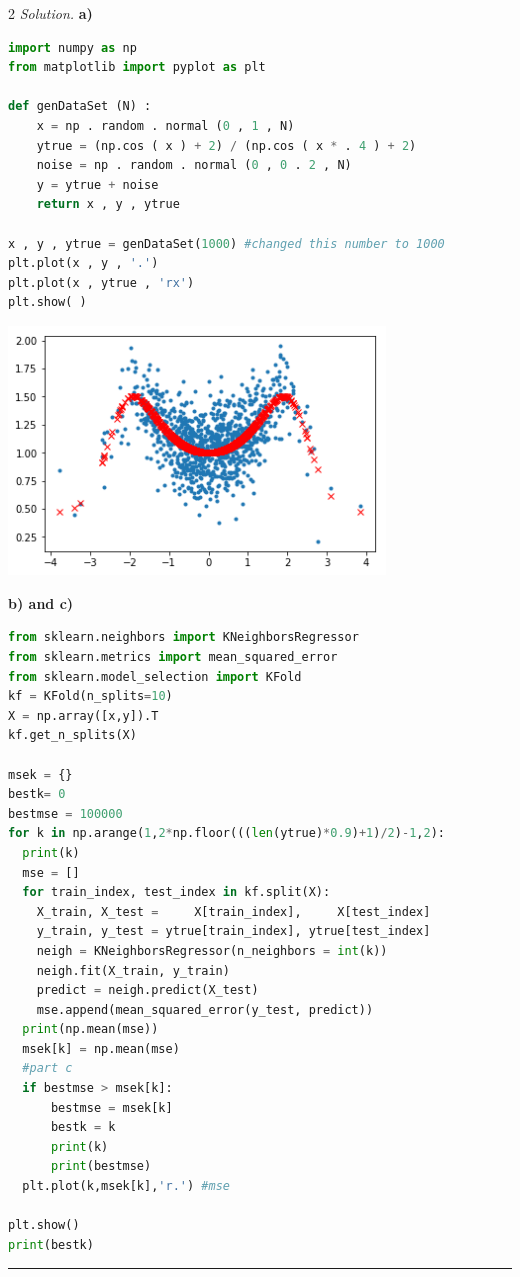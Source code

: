 \documentclass[12pt]{article}
\newcommand{\spacingfactor}{2}
\newcommand\myqed{}                 %
\newcommand{\printmyqed}[1][]       %
  {%
  \ifthenelse{\equal{#1}{Proof}}
  {\renewcommand{\myqed}{\qed}}
  {\renewcommand{\myqed}{}}
  }
\newenvironment{response}[1][\textit{Solution}]{%
  \printmyqed[#1]
  \begin{spacing}{\spacingfactor}
  \medskip                          %
  \noindent \textit{#1.}}{\myqed\end{spacing}\medskip\hrule}
\begin{document}
  
\begin{response}[Solution]
  \textbf{a)} 
  \lstset{language=Python,frame=single}
  \begin{lstlisting}[language=Python,frame=single]
import numpy as np
from matplotlib import pyplot as plt

def genDataSet (N) :
    x = np . random . normal (0 , 1 , N)
    ytrue = (np.cos ( x ) + 2) / (np.cos ( x * . 4 ) + 2)
    noise = np . random . normal (0 , 0 . 2 , N)
    y = ytrue + noise
    return x , y , ytrue

x , y , ytrue = genDataSet(1000) #changed this number to 1000
plt.plot(x , y , '.')
plt.plot(x , ytrue , 'rx')
plt.show( )
  \end{lstlisting}
  \includegraphics[width=100mm]{1a.png}

  \textbf{b) and c)} 
  \lstset{language=Python,frame=single}
  \begin{lstlisting}[language=Python,frame=single]
from sklearn.neighbors import KNeighborsRegressor
from sklearn.metrics import mean_squared_error
from sklearn.model_selection import KFold
kf = KFold(n_splits=10)
X = np.array([x,y]).T
kf.get_n_splits(X)
  
msek = {}
bestk= 0
bestmse = 100000
for k in np.arange(1,2*np.floor(((len(ytrue)*0.9)+1)/2)-1,2):
  print(k)
  mse = []
  for train_index, test_index in kf.split(X):
    X_train, X_test =     X[train_index],     X[test_index]
    y_train, y_test = ytrue[train_index], ytrue[test_index]
    neigh = KNeighborsRegressor(n_neighbors = int(k))
    neigh.fit(X_train, y_train) 
    predict = neigh.predict(X_test) 
    mse.append(mean_squared_error(y_test, predict))
  print(np.mean(mse))
  msek[k] = np.mean(mse)
  #part c
  if bestmse > msek[k]:
      bestmse = msek[k]
      bestk = k
      print(k)
      print(bestmse)
  plt.plot(k,msek[k],'r.') #mse

plt.show()
print(bestk)
  \end{lstlisting}


\end{response}
\end{document}
